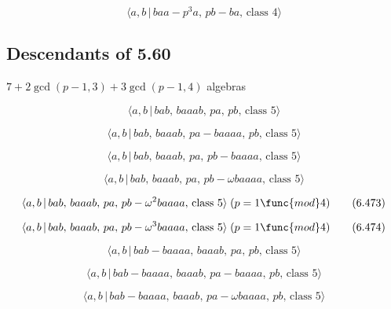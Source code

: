 \documentclass[10pt]{article}
\begin{document}
\begin{equation}
\langle a,b\,|\,baa-p^3a,\,pb-ba,\,\text{class }4\rangle  \tag{6.468}
\end{equation}

\subsection{Descendants of 5.60}

$7+2\gcd (p-1,3)+3\gcd (p-1,4)$ algebras

\begin{equation}
\langle a,b\,|\,bab,\,baaab,\,pa,\,pb,\,\text{class }5\rangle  \tag{6.469}
\end{equation}

\begin{equation}
\langle a,b\,|\,bab,\,baaab,\,pa-baaaa,\,pb,\,\text{class }5\rangle 
\tag{6.470}
\end{equation}

\begin{equation}
\langle a,b\,|\,bab,\,baaab,\,pa,\,pb-baaaa,\,\text{class }5\rangle 
\tag{6.471}
\end{equation}

\begin{equation}
\langle a,b\,|\,bab,\,baaab,\,pa,\,pb-\omega baaaa,\,\text{class }5\rangle 
\tag{6.472}
\end{equation}

\begin{equation}
\langle a,b\,|\,bab,\,baaab,\,pa,\,pb-\omega ^2baaaa,\,\text{class }%
5\rangle\;(p=1 \func{mod} 4)  \tag{6.473}
\end{equation}

\begin{equation}
\langle a,b\,|\,bab,\,baaab,\,pa,\,pb-\omega ^3baaaa,\,\text{class }%
5\rangle\;(p=1 \func{mod} 4)  \tag{6.474}
\end{equation}

\begin{equation}
\langle a,b\,|\,bab-baaaa,\,baaab,\,pa,\,pb,\,\text{class }5\rangle 
\tag{6.475}
\end{equation}

\begin{equation}
\langle a,b\,|\,bab-baaaa,\,baaab,\,pa-baaaa,\,pb,\,\text{class }5\rangle 
\tag{6.476}
\end{equation}

\begin{equation}
\langle a,b\,|\,bab-baaaa,\,baaab,\,pa-\omega baaaa,\,pb,\,\text{class }%
5\rangle  \tag{6.477}
\end{equation}
\end{document}
